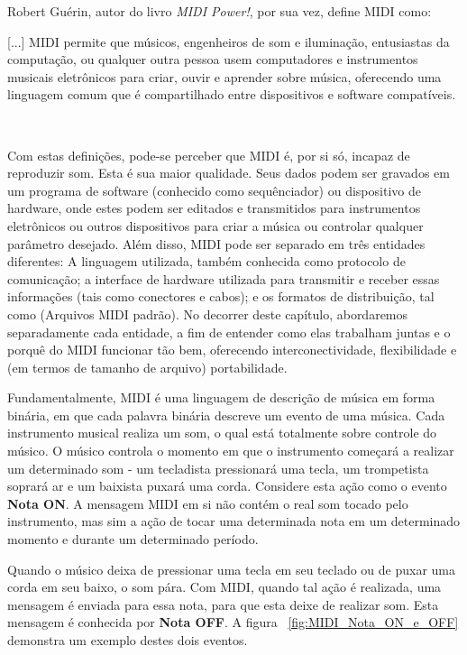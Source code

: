             Robert Guérin, autor do livro \textit{MIDI Power!}, por sua vez, define MIDI como: \epigraph{[...] MIDI permite que músicos, engenheiros de som e iluminação, entusiastas da computação, ou qualquer outra pessoa usem computadores e instrumentos musicais eletrônicos para criar, ouvir e aprender sobre música, oferecendo uma linguagem comum que é compartilhado entre dispositivos e software compatíveis.}{~\cite{Guerin}}

            Com estas definições, pode-se perceber que MIDI é, por si só, incapaz de reproduzir som. Esta é sua maior qualidade. Seus dados podem ser gravados em um programa de software (conhecido como sequênciador) ou dispositivo de hardware, onde estes podem ser editados e transmitidos para instrumentos eletrônicos ou outros dispositivos para criar a música ou controlar qualquer parâmetro desejado. Além disso, MIDI pode ser separado em três entidades diferentes: A linguagem utilizada, também conhecida como protocolo de comunicação; a interface de hardware utilizada para transmitir e receber essas informações (tais como conectores e cabos); e os formatos de distribuição, tal como  (Arquivos MIDI padrão). No decorrer deste capítulo, abordaremos separadamente cada entidade, a fim de entender como elas trabalham juntas e o porquê do MIDI funcionar tão bem, oferecendo interconectividade, flexibilidade e (em termos de tamanho de arquivo) portabilidade.

            Fundamentalmente, MIDI é uma linguagem de descrição de música em forma binária, em que cada palavra binária descreve um evento de uma música. Cada instrumento musical realiza um som, o qual está totalmente sobre controle do músico. O músico controla o momento em que o instrumento começará a realizar um determinado som - um tecladista pressionará uma tecla, um trompetista soprará ar e um baixista puxará uma corda. Considere esta ação como o evento \textbf{Nota ON}. A mensagem MIDI em si não contém o real som tocado pelo instrumento, mas sim a ação de tocar uma determinada nota em um determinado momento e durante um determinado período.

            Quando o músico deixa de pressionar uma tecla em seu teclado ou de puxar uma corda em seu baixo, o som pára. Com MIDI, quando tal ação é realizada, uma mensagem é enviada para essa nota, para que esta deixe de realizar som. Esta mensagem é conhecida por \textbf{Nota OFF}. A figura ~\ref{fig:MIDI_Nota_ON_e_OFF} demonstra um exemplo destes dois eventos.

